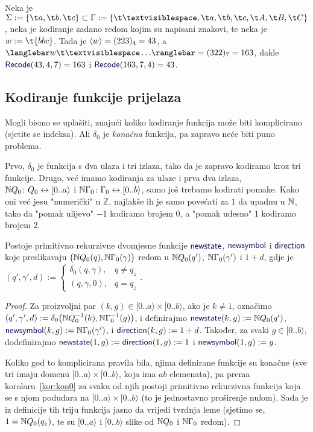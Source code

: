 \begin{primjer}
Neka je $\Sigma:=\{\t a,\t b,\t c\}\subset\Gamma:=\{\bl,\t a,\t b,\t c,\t A,\t B,\t C\}$, neka je kodiranje zadano redom kojim su napisani znakovi, te neka je $w:=\t{bbc}$. Tada je $\langle w\rangle=(223)_4=43$, a $\knk{w\bl\ldots}=(322)_7=163$, dakle $\f{Recode}(43,4,7)=163$ i $\f{Recode}(163,7,4)=43$.
\end{primjer}

\subsection{Kodiranje funkcije prijelaza}

Mogli bismo se uplašiti, znajući koliko kodiranje funkcija može biti komplicirano (sjetite se indeksa). Ali $\delta_0$ je \emph{konačna} funkcija, pa zapravo neće biti puno problema.

Prvo, $\delta_0$ je funkcija s dva ulaza i tri izlaza, tako da je zapravo kodiramo kroz tri funkcije. Drugo, već imamo kodiranja za ulaze i prva dva izlaza, ${\mathbb N} Q_0\colon Q_0\leftrightarrow[0..a\rangle$ i ${\mathbb N}\Gamma_0\colon\Gamma_0\leftrightarrow[0..b\rangle$, samo još trebamo kodirati pomake. Kako oni već jesu "numerički" u $\mathbb Z$, najlakše ih je samo povećati za $1$ da upadnu u ${\mathbb N}$, tako da "pomak ulijevo" $-1$ kodiramo brojem $0$, a "pomak udesno" $1$ kodiramo brojem $2$.

\begin{lema}\label{lm:newssdprn}
Postoje primitivno rekurzivne dvomjesne funkcije $\f{newstate}$, $\f{newsymbol}$ i $\f{direction}$ koje preslikavaju $\bigl({\mathbb N} Q_0(q),{\mathbb N}\Gamma_0(\gamma)\bigr)$ redom u ${\mathbb N} Q_0(q')$, ${\mathbb N}\Gamma_0(\gamma')$ i $1+d$, gdje je 
$(q',\gamma',d):=\begin{cases}
\delta_0(q,\gamma),& q\not=q_z\\
(q,\gamma,0),&q=q_z\end{cases}$.
\end{lema}
\begin{proof}
Za proizvoljni par $(k,g)\in[0..a\rangle\times[0..b\rangle$, ako je $k\not=1$, označimo $(q',\gamma',d):=\delta_0\bigl({\mathbb N} Q_0^{-1}(k),{\mathbb N}\Gamma_0^{-1}(g)\bigr)$, i definirajmo $\f{newstate}(k,g):=\N Q_0(q')$, $\f{newsymbol}(k,g):=\N\Gamma_0(\gamma')$, i $\f{direction}(k,g):=1+d$. Također, za svaki $g\in[0..b\rangle$, dodefinirajmo $\f{newstate}(1,g):=\f{direction}(1,g):=1$ i $\f{newsymbol}(1,g):=g$.

Koliko god to komplicirana pravila bila, njima definirane funkcije su konačne (sve tri imaju domenu $[0..a\rangle\times[0..b\rangle$, koja ima $ab$ elemenata), pa prema korolaru~\ref{kor:kon0} za svaku od njih postoji primitivno rekurzivna funkcija koja se s njom podudara na $[0..a\rangle\times[0..b\rangle$ (to je jednostavno proširenje nulom). Sada je iz definicije tih triju funkcija jasno da vrijedi tvrdnja leme (sjetimo se, $1={\mathbb N} Q_0(q_z)$, te su $[0..a\rangle$ i $[0..b\rangle$ slike od ${\mathbb N} Q_0$ i ${\mathbb N}\Gamma_0$ redom).
\end{proof}

